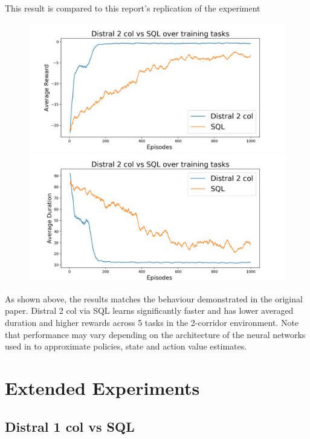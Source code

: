 \documentclass[12pt]{report}
\begin{document}
This result is compared to this report's replication of the experiment
\begin{figure}[H]
\centering
\begin{minipage}{.5\textwidth}
\centering
\includegraphics[width=\textwidth]{figs/distral_2_col_SQL_avg_rwd.png}
\end{minipage}%
\centering
\begin{minipage}{.5\textwidth}
\centering
\includegraphics[width=\textwidth]{figs/distral_2_col_SQL_avg_dur.png}
\end{minipage}%
\end{figure}
As shown above, the results matches the behaviour demonstrated in the original paper. Distral 2 col via SQL learns significantly faster and has lower averaged duration and higher rewards across 5 tasks in the 2-corridor environment. Note that performance may vary depending on the architecture of the neural networks used in to approximate policies, state and action value estimates.

\section{Extended Experiments}
\subsection{Distral 1 col vs SQL}
\end{document}
